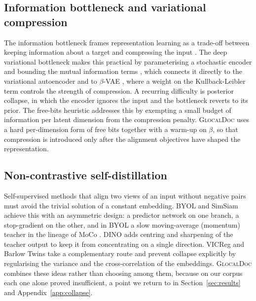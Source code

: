 \documentclass[conference]{IEEEtran}
\newcommand{\glocal}{\textsc{GlocalDoc}}
\begin{document}
\subsection{Information bottleneck and variational compression}
The information bottleneck frames representation learning as a trade-off between
keeping information about a target and compressing the input
\cite{tishby2000information,tishby2015deep}. The deep variational bottleneck makes
this practical by parameterising a stochastic encoder and bounding the mutual
information terms \cite{alemi2017deep}, which connects it directly to the
variational autoencoder \cite{kingma2014auto} and to $\beta$-VAE
\cite{higgins2017beta}, where a weight on the Kullback-Leibler term controls the
strength of compression. A recurring difficulty is posterior collapse, in which the
encoder ignores the input and the bottleneck reverts to its prior. The free-bits
heuristic \cite{kingma2016improved} addresses this by exempting a small budget of
information per latent dimension from the compression penalty. \glocal{} uses a
hard per-dimension form of free bits together with a warm-up on $\beta$, so that
compression is introduced only after the alignment objectives have shaped the
representation.

\subsection{Non-contrastive self-distillation}
Self-supervised methods that align two views of an input without negative pairs
must avoid the trivial solution of a constant embedding. BYOL \cite{grill2020bootstrap}
and SimSiam \cite{chen2021exploring} achieve this with an asymmetric design: a
predictor network on one branch, a stop-gradient on the other, and in BYOL a slow
moving-average (momentum) teacher in the lineage of MoCo \cite{he2020momentum}.
DINO \cite{caron2021emerging} adds centring and sharpening of the teacher output to
keep it from concentrating on a single direction. VICReg \cite{bardes2022vicreg}
and Barlow Twins \cite{zbontar2021barlow} take a complementary route and prevent
collapse explicitly by regularising the variance and the cross-correlation of the
embeddings. \glocal{} combines these ideas rather than choosing among them, because
on our corpus each one alone proved insufficient, a point we return to in
Section~\ref{sec:results} and Appendix~\ref{app:collapse}.
\end{document}

